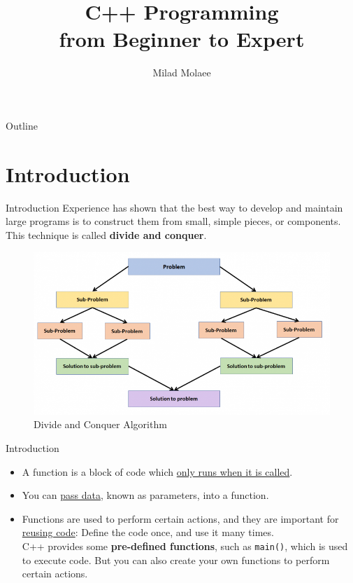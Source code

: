\documentclass[10pt]{beamer}
\author[miladmolaee@hotmail.com]{\large Milad Molaee}
\title[C++ Programming]{C++ Programming\\\vspace{5pt}from Beginner to Expert\\\vspace{20pt}{\color{darkblue}\large Chapter 7: Functions and an Introduction to Recursion}}
\begin{document}
 
%
\frame{\titlepage}

%
\begin{frame}{Outline}
\footnotesize\tableofcontents
\end{frame}


\section{Introduction}
\begin{frame}{Introduction}
	\justifying
	Experience has shown that the best way to develop and maintain large programs is to construct them from small, simple pieces, or components. This technique is
	called \textbf{divide and conquer}.
	\\\vspace{10pt}
	\begin{center}
		\begin{figure}
			\includegraphics[width=0.7\linewidth]{./.images/.img-6-1.png}
			\caption{Divide and Conquer Algorithm}
		\end{figure}
	\end{center}
\end{frame}


\begin{frame}{Introduction}
	\justifying
	\begin{itemize}
		\setlength\itemsep{0.5em}
		\item [\color{purple}\blacksquare] A function is a block of code which \underline{only runs when it is called}.
		\item [\color{purple}\blacksquare] You can \underline{pass data}, known as parameters, into a function.
		\item [\color{purple}\blacksquare] Functions are used to perform certain actions, and they are important for \underline{reusing code}: Define the code once, and use it many times.
		\\\vspace{10pt}
		C++ provides some \textbf{pre-defined functions}, such as \texttt{\color{blue}main()}, which is used to execute code. But you can also create your own functions to perform certain actions.
		\\\vspace{8pt}
		
	\end{itemize}
\end{frame}
\end{document}
